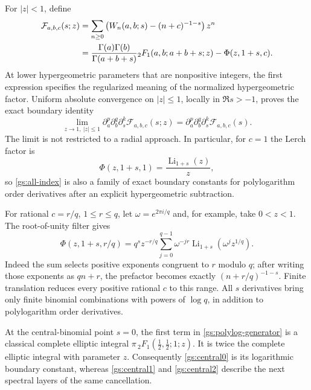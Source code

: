 For $|z|<1$, define
\begin{align}
 \mathcal F_{a,b,c}(s;z)
 &=\sum_{n\ge0}
 \left(W_n(a,b;s)-(n+c)^{-1-s}\right)z^n\notag\\
 &=\frac{\Gamma(a)\Gamma(b)}{\Gamma(a+b+s)}
 {}_2F_1(a,b;a+b+s;z)-\Phi(z,1+s,c).
 \label{gs:polylog-generator}
\end{align}
At lower hypergeometric parameters that are nonpositive integers, the
first expression specifies the regularized meaning of the normalized
hypergeometric factor.  Uniform absolute convergence on $|z|\le1$,
locally in $\Re s>-1$, proves the exact boundary identity
\begin{equation}\label{gs:boundary}
 \lim_{z\to1,\ |z|\le1}\partial_a^p\partial_b^q\partial_s^k
 \mathcal F_{a,b,c}(s;z)
 =\partial_a^p\partial_b^q\partial_s^k\mathcal F_{a,b,c}(s).
\end{equation}
The limit is not restricted to a radial approach.  In particular, for
$c=1$ the Lerch factor is
\begin{equation}\label{gs:Li-bridge}
 \Phi(z,1+s,1)=\frac{\operatorname{Li}_{1+s}(z)}z,
\end{equation}
so \eqref{gs:all-index} is also a family of exact boundary constants
for polylogarithm order derivatives after an explicit hypergeometric
subtraction.

For rational $c=r/q$, $1\le r\le q$, let $\omega=e^{2\pi i/q}$ and,
for example, take $0<z<1$.  The root-of-unity filter gives
\begin{equation}\label{gs:rational-Lerch}
 \Phi(z,1+s,r/q)=q^s z^{-r/q}
 \sum_{j=0}^{q-1}\omega^{-jr}
 \operatorname{Li}_{1+s}(\omega^jz^{1/q}).
\end{equation}
Indeed the sum selects positive exponents congruent to $r$ modulo $q$;
after writing those exponents as $qn+r$, the prefactor becomes exactly
$(n+r/q)^{-1-s}$.  Finite translation reduces every positive rational
$c$ to this range.  All $s$ derivatives bring only finite binomial
combinations with powers of $\log q$, in addition to polylogarithm order
derivatives.

At the central-binomial point $s=0$, the first term in
\eqref{gs:polylog-generator} is a classical complete elliptic integral
$\pi\,{}_2F_1(\tfrac12,\tfrac12;1;z)$.
It is twice the complete elliptic integral with parameter $z$.
Consequently \eqref{gs:central0} is its logarithmic boundary constant,
whereas \eqref{gs:central1} and \eqref{gs:central2} describe the next
spectral layers of the same cancellation.

